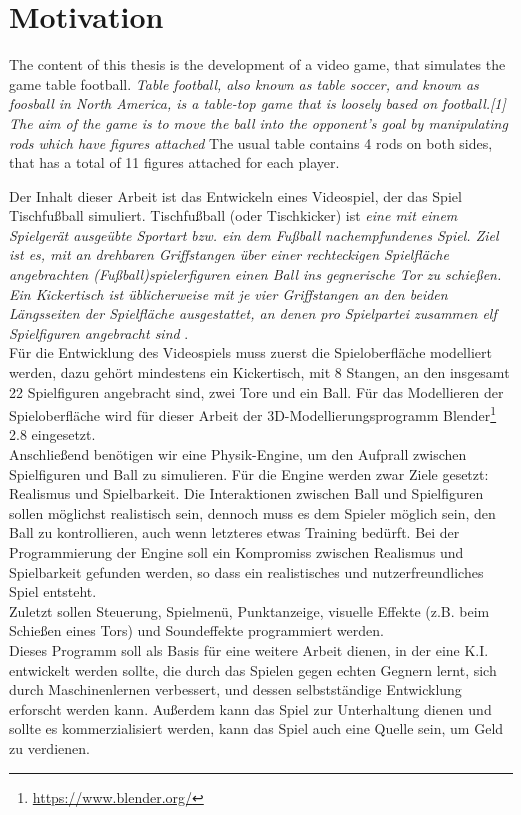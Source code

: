 \section{Motivation}

The content of this thesis is the development of a video game, that simulates the game table football. \textit{Table football, also known as table soccer, and known as foosball in North America, is a table-top game that is loosely based on football.[1] The aim of the game is to move the ball into the opponent's goal by manipulating rods which have figures attached}\citep{table_football} The usual table contains 4 rods on both sides, that has a total of 11 figures attached for each player.



Der Inhalt dieser Arbeit ist das Entwickeln eines Videospiel, der das Spiel Tischfußball simuliert. Tischfußball (oder Tischkicker) ist \textit{eine mit einem Spielgerät ausgeübte Sportart bzw. ein dem Fußball nachempfundenes Spiel. Ziel ist es, mit an drehbaren Griffstangen über einer rechteckigen Spielfläche angebrachten (Fußball)spielerfiguren einen Ball ins gegnerische Tor zu schießen. Ein Kickertisch ist üblicherweise mit je vier Griffstangen an den beiden Längsseiten der Spielfläche ausgestattet, an denen pro Spielpartei zusammen elf Spielfiguren angebracht sind} \citep{Tischkicker}.\\

Für die Entwicklung des Videospiels muss zuerst die Spieloberfläche modelliert werden, dazu gehört mindestens ein Kickertisch, mit 8 Stangen, an den insgesamt 22 Spielfiguren angebracht sind, zwei Tore und ein Ball. Für das Modellieren der Spieloberfläche wird für dieser Arbeit der 3D-Modellierungsprogramm Blender\footnote{\url{https://www.blender.org/}} 2.8 eingesetzt.\\

Anschließend benötigen wir eine Physik-Engine, um den Aufprall zwischen Spielfiguren und Ball zu simulieren. Für die Engine werden zwar Ziele gesetzt: Realismus und Spielbarkeit. Die Interaktionen zwischen Ball und Spielfiguren sollen möglichst realistisch sein, dennoch muss es dem Spieler möglich sein, den Ball zu kontrollieren, auch wenn letzteres etwas Training bedürft. Bei der Programmierung der Engine soll ein Kompromiss zwischen Realismus und Spielbarkeit gefunden werden, so dass ein realistisches und nutzerfreundliches Spiel entsteht.\\

Zuletzt sollen Steuerung, Spielmenü, Punktanzeige, visuelle Effekte (z.B. beim Schießen eines Tors) und Soundeffekte programmiert werden.\\

Dieses Programm soll als Basis für eine weitere Arbeit dienen, in der eine K.I. entwickelt werden sollte, die durch das Spielen gegen echten Gegnern lernt, sich durch Maschinenlernen verbessert, und dessen selbstständige Entwicklung erforscht werden kann. Außerdem kann das Spiel zur Unterhaltung dienen und sollte es kommerzialisiert werden, kann das Spiel auch eine Quelle sein, um Geld zu verdienen.
